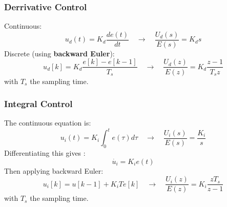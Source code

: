 \begin{frame}
	\frametitle{Derrivative Control}
	Continuous:
	\begin{equation*}
		u_d(t) = K_d \frac{de(t)}{dt} \quad \rightarrow \quad \frac{U_d(s)}{E(s)} = K_d s 
	\end{equation*}
	Discrete (using \textbf{backward Euler}):
	\begin{equation*}
	u_d[k] = K_d \frac{ e[k] - e[k-1]}{T_s} \quad \rightarrow \quad \frac{U_d(z)}{E(z)} = K_d \frac{z - 1}{T_sz}
	\end{equation*}
	with $T_s$ the sampling time.
\end{frame}

\begin{frame}
	\frametitle{Integral Control}
	The continuous equation is:
	\begin{equation*}
		u_i(t) = K_i \int_0^t e(\tau)d\tau \quad \rightarrow \quad \frac{U_i(s)}{E(s)} = \frac{K_i}{s} 
	\end{equation*}
	Differentiating this gives :
	\begin{equation*}
		\dot{u_i} = K_i e(t)
	\end{equation*}
	Then applying backward Euler:
	\begin{equation*}
	u_i[k] = u[k-1] + K_i T e[k] \quad \rightarrow \quad \frac{U_i(z)}{E(z)} = K_i \frac{z T_s}{z - 1}
	\end{equation*}
	with $T_s$ the sampling time.
\end{frame}

